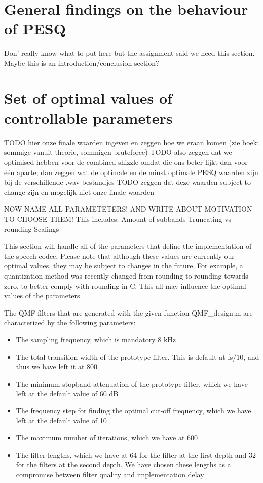 \documentclass[a4paper]{article}
\begin{document}
\section{General findings on the behaviour of PESQ}
Don' really know what to put here but the assignment said we need this section. Maybe this is an introduction/conclusion section?

\section{Set of optimal values of controllable parameters}
TODO hier onze finale waarden ingeven en zeggen hoe we eraan komen (zie boek: sommige vanuit theorie, sommigen bruteforce)
TODO also zeggen dat we optimised hebben voor de combined shizzle omdat die ons beter lijkt dan voor één aparte; dan zeggen wat de optimale en de minst optimale PESQ waarden zijn bij de verschillende .wav bestandjes
TODO zeggen dat deze waarden subject to change zijn en mogelijk niet onze finale waarden

NOW NAME ALL PARAMETETERS! AND WRITE ABOUT MOTIVATION TO CHOOSE THEM! This includes:
Amount of subbands
Truncating vs rounding
Scalings

This section will handle all of the parameters that define the implementation of the speech codec. Please note that although these values are currently our optimal values, they may be subject to changes in the future. For example, a quantization method was recently changed from rounding to rounding towards zero, to better comply with rounding in C. This all may influence the optimal values of the parameters.

The QMF filters that are generated with the given function QMF\_design.m are characterized by the following parameters:

\begin{itemize}
\item The sampling frequency, which is mandatory 8 kHz
\item The total transition width of the prototype filter. This is default at fs/10, and thus we have left it at 800
\item The minimum stopband attenuation of the prototype filter, which we have left at the default value of 60 dB
\item The frequency step for finding the optimal cut-off frequency, which we have left at the default value of 10
\item The maximum number of iterations, which we have at 600
\item The filter lengths, which we have at 64 for the filter at the first depth and 32 for the filters at the second depth. We have chosen these lengths as a compromise between filter quality and implementation delay
\end{itemize}
\end{document}
